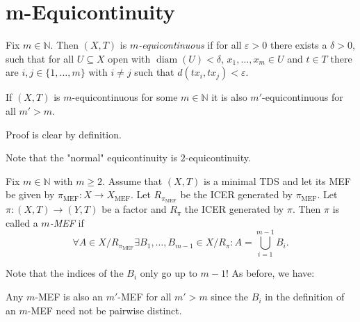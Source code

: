 \section{m-Equicontinuity}

\begin{frame}
	\begin{definition}[$m$-Equicontinuity \cite{Garcia-Ramos2024}\footnote{The corresponding sensitivity notion appeared in \cite{Jincheng2005}]
	    Fix $m \in \mathbb{N}$. Then $(X, T)$ is \emph{$m$-equicontinuous} if for all $\varepsilon > 0$ there exists a $\delta > 0$, such that for all $U \subseteq X$ open with $\operatorname{diam}(U) < \delta$, $x_1, \dots, x_m \in U$ and $t \in T$ there are $i, j \in \{1, \dots, m\}$ with $i \neq j$ such that $d(tx_i, tx_j) < \varepsilon$.
    \end{definition}
    \pause
    \begin{proposition}
	    If $(X, T)$ is $m$-equicontinuous for some $m \in \mathbb{N}$ it is also $m'$-equicontinuous for all $m' > m$.
    \end{proposition}
    Proof is clear by definition.

    Note that the "normal" equicontinuity is $2$-equicontinuity.
\end{frame}

\begin{frame}
    \begin{definition}[$m$-MEF]
        Fix $m \in \mathbb{N}$ with $m \geq 2$. Assume that $(X, T)$ is a minimal TDS and let its MEF be given by $\pi_{\mathrm{MEF}}: X \to X_{\mathrm{MEF}}$.
        Let $R_{\pi_{\mathrm{MEF}}}$ be the ICER generated by $\pi_{\text{MEF}}$. Let $\pi: (X,T) \to (Y,T)$ be a factor and $R_\pi$ the ICER generated by $\pi$.
        Then $\pi$ is called a \emph{$m$-MEF} if
        \begin{equation*}
            \forall A \in X/R_{\pi_{\mathrm{MEF}}} \exists B_1, \dots, B_{m-1} \in X/R_\pi: 
            A = \bigcup_{i=1}^{m-1} B_i.
        \end{equation*}
    \end{definition}
    Note that the indices of the $B_i$ only go up to $m-1$!
    \pause
    As before, we have:
    \begin{remark}
        Any $m$-MEF is also an $m'$-MEF for all $m' > m$
        since the $B_i$ in the definition of an $m$-MEF need not be pairwise distinct.
    \end{remark}
\end{frame}

